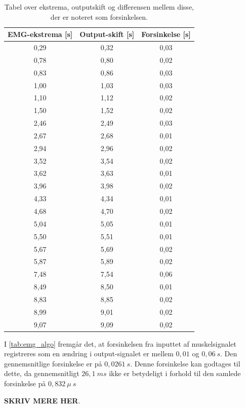 \begin{table}[H]
\centering
\begin{tabular}{|c|c|c|}
\hline 
\textbf{EMG-ekstrema [s]} & \textbf{Output-skift [s]} & \textbf{Forsinkelse [s]}\\ 
\hline 
0,29 & 0,32 & 0,03\\ 
\hline 
0,78 & 0,80 & 0,02\\ 
\hline 
0,83 & 0,86 & 0,03\\ 
\hline 
1,00 & 1,03 & 0,03\\ 
\hline 
1,10 & 1,12 & 0,02\\ 
\hline 
1,50 & 1,52 & 0,02\\ 
\hline 
2,46 & 2,49 & 0,03\\ 
\hline 
2,67 & 2,68 & 0,01\\ 
\hline 
2,94 & 2,96 & 0,02\\ 
\hline 
3,52 & 3,54 & 0,02\\ 
\hline 
3,62 & 3,63 & 0,01\\ 
\hline 
3,96 & 3,98 & 0,02\\ 
\hline 
4,33 & 4,34 & 0,01\\ 
\hline 
4,68 & 4,70 & 0,02\\ 
\hline 
5,04 & 5,05 & 0,01\\ 
\hline 
5,50 & 5,51 & 0,01\\ 
\hline 
5,67 & 5,69 & 0,02\\ 
\hline 
5,87 & 5,89 & 0,02\\ 
\hline 
7,48 & 7,54 & 0,06\\ 
\hline 
8,49 & 8,50 & 0,01\\ 
\hline 
8,83 & 8,85 & 0,02\\ 
\hline 
8,99 & 9,01 & 0,02\\ 
\hline 
9,07 & 9,09 & 0,02\\ 
\hline 
\end{tabular} 
\caption{Tabel over ekstrema, outputskift og differensen mellem disse, der er noteret som forsinkelsen.}
\label{tab:emg_algo}
\end{table}

\noindent
I \autoref{tab:emg_algo} fremgår det, at forsinkelsen fra inputtet af muskelsignalet registreres som en ændring i output-signalet er mellem $0,01$ og $0,06~s$. Den gennemsnitlige forsinkelse er på $0,0261~s$. Denne forsinkelse kan godtages til dette, da gennemsnitligt $26,1~ms$ ikke er betydeligt i forhold til den samlede forsinkelse på $0,832~\mu~s$



 \textbf{SKRIV MERE HER}.
